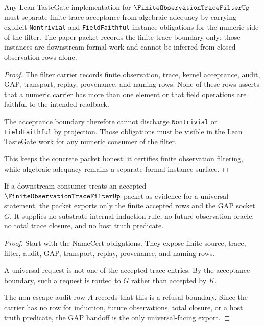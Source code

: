 \begin{theorem}
\label{thm:finite-observation-trace-filter-tastegate-worklist}
Any Lean TasteGate implementation for $\FiniteObservationTraceFilterUp$ must
separate finite trace acceptance from algebraic adequacy by carrying explicit
\texttt{Nontrivial} and \texttt{FieldFaithful} instance obligations for the
numeric side of the filter. The paper packet records the finite trace boundary
only; those instances are downstream formal work and cannot be inferred from
closed observation rows alone.
\end{theorem}
\begin{proof}
The filter carrier records finite observation, trace, kernel acceptance,
audit, GAP, transport, replay, provenance, and naming rows. None of these rows
asserts that a numeric carrier has more than one element or that field
operations are faithful to the intended readback.

The acceptance boundary therefore cannot discharge \texttt{Nontrivial} or
\texttt{FieldFaithful} by projection. Those obligations must be visible in
the Lean TasteGate work for any numeric consumer of the filter.

This keeps the concrete packet honest: it certifies finite observation
filtering, while algebraic adequacy remains a separate formal instance
surface.
\end{proof}

\begin{theorem}
\label{thm:finite-observation-trace-filter-gap-handoff}
If a downstream consumer treats an accepted $\FiniteObservationTraceFilterUp$
packet as evidence for a universal statement, the packet exports only the
finite accepted rows and the GAP socket $G$. It supplies no substrate-internal
induction rule, no future-observation oracle, no total trace closure, and no
host truth predicate.
\end{theorem}
\begin{proof}
Start with the NameCert obligations. They expose finite source, trace, filter,
audit, GAP, transport, replay, provenance, and naming rows.

A universal request is not one of the accepted trace entries. By the acceptance
boundary, such a request is routed to $G$ rather than accepted by $K$.

The non-escape audit row $A$ records that this is a refusal boundary. Since
the carrier has no row for induction, future observations, total closure, or a
host truth predicate, the GAP handoff is the only universal-facing export.
\end{proof}

